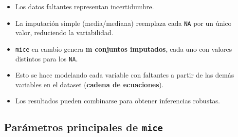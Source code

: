 \documentclass[
]{book}
\providecommand{\tightlist}{%
  \setlength{\itemsep}{0pt}\setlength{\parskip}{0pt}}
\begin{document}
\begin{itemize}
\tightlist
\item
  Los datos faltantes representan incertidumbre.\\
\item
  La imputación simple (media/mediana) reemplaza cada \texttt{NA} por un único valor, reduciendo la variabilidad.\\
\item
  \texttt{mice} en cambio genera \textbf{m conjuntos imputados}, cada uno con valores distintos para los \texttt{NA}.\\
\item
  Esto se hace modelando cada variable con faltantes a partir de las demás variables en el dataset (\textbf{cadena de ecuaciones}).\\
\item
  Los resultados pueden combinarse para obtener inferencias robustas.
\end{itemize}

\subsection{\texorpdfstring{Parámetros principales de \texttt{mice}}{Parámetros principales de mice}}\label{paruxe1metros-principales-de-mice}
\end{document}
